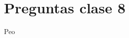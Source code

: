 \documentclass[../main_ej.tex]{subfiles}
\begin{document}
\section{Preguntas clase 8}
Peo
 
\end{document}
